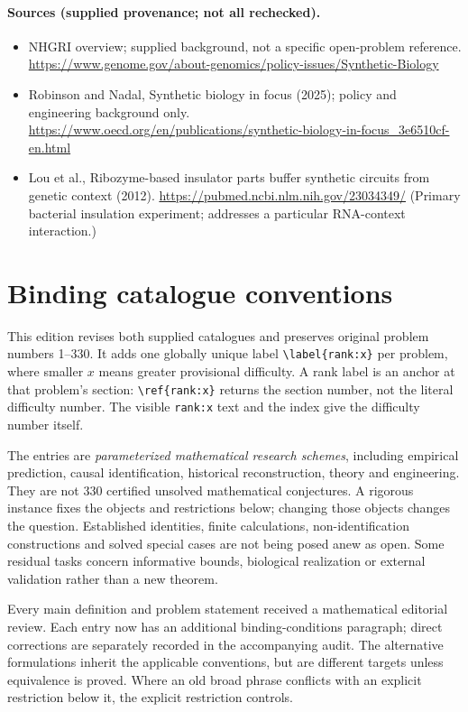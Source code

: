 \documentclass[11pt]{article}
\begin{document}
\paragraph{Sources (supplied provenance; not all rechecked).} \begin{itemize}
\item NHGRI overview; supplied background, not a specific open-problem reference. \url{https://www.genome.gov/about-genomics/policy-issues/Synthetic-Biology}
\item Robinson and Nadal, Synthetic biology in focus (2025); policy and engineering background only. \url{https://www.oecd.org/en/publications/synthetic-biology-in-focus_3e6510cf-en.html}
\item Lou et al., Ribozyme-based insulator parts buffer synthetic circuits from genetic context (2012). \url{https://pubmed.ncbi.nlm.nih.gov/23034349/} (Primary bacterial insulation experiment; addresses a particular RNA-context interaction.)
\end{itemize}


\section*{Binding catalogue conventions}
This edition revises both supplied catalogues and preserves original problem numbers 1--330. It adds one globally unique label \verb|\label{rank:x}| per problem, where smaller $x$ means greater provisional difficulty. A rank label is an anchor at that problem's section: \verb|\ref{rank:x}| returns the section number, not the literal difficulty number. The visible \texttt{rank:x} text and the index give the difficulty number itself.

The entries are \emph{parameterized mathematical research schemes}, including empirical prediction, causal identification, historical reconstruction, theory and engineering. They are not 330 certified unsolved mathematical conjectures. A rigorous instance fixes the objects and restrictions below; changing those objects changes the question. Established identities, finite calculations, non-identification constructions and solved special cases are not being posed anew as open. Some residual tasks concern informative bounds, biological realization or external validation rather than a new theorem.

Every main definition and problem statement received a mathematical editorial review. Each entry now has an additional binding-conditions paragraph; direct corrections are separately recorded in the accompanying audit. The alternative formulations inherit the applicable conventions, but are different targets unless equivalence is proved. Where an old broad phrase conflicts with an explicit restriction below it, the explicit restriction controls.
\end{document}
